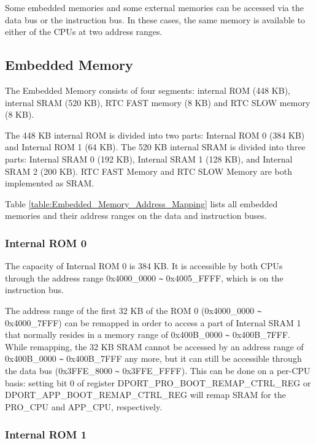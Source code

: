 \documentclass[main\_\_EN.tex]{subfiles}
\begin{document}
Some embedded memories and some external memories can be accessed via the data bus or the instruction bus. In these cases, the same memory is available to either of the CPUs at two address ranges.




\subsection{Embedded Memory}\label{para:embedded memory}

The Embedded Memory consists of four segments: internal ROM (448 KB), internal SRAM (520 KB), RTC FAST memory (8 KB) and RTC SLOW memory (8 KB).

The 448 KB internal ROM is divided into two parts: Internal ROM 0 (384 KB) and Internal ROM 1 (64 KB).
The 520 KB internal SRAM is divided into three parts: Internal SRAM 0 (192 KB), Internal SRAM 1 (128 KB), and Internal SRAM 2 (200 KB).
RTC FAST Memory and RTC SLOW Memory are both implemented as SRAM.

Table \ref{table:Embedded_Memory_Address_Mapping} lists all embedded memories and their address ranges on the data and instruction buses.
\newpage



\subsubsection{Internal ROM 0}

The capacity of Internal ROM 0 is 384 KB. It is accessible by both CPUs through the address range 0x4000\_0000 \verb+~+ 0x4005\_FFFF, which is on the instruction bus.

\label{para:RemapInternalROM0}
\hypertarget{Remap}{}
The address range of the first 32 KB of the ROM 0 (0x4000\_0000 \verb+~+ 0x4000\_7FFF)
can be remapped in order to access a part of Internal SRAM 1 that normally resides in a memory range of 0x400B\_0000 \verb+~+ 0x400B\_7FFF. While remapping, the 32 KB SRAM cannot be accessed by an address range of 0x400B\_0000 \verb+~+ 0x400B\_7FFF any more,
but it can still be accessible through the data bus (0x3FFE\_8000 \verb+~+ 0x3FFE\_FFFF).
This can be done on a per-CPU basis: setting bit 0 of register DPORT\_PRO\_BOOT\_REMAP\_CTRL\_REG or DPORT\_APP\_BOOT\_REMAP\_CTRL\_REG will remap SRAM for the PRO\_CPU and APP\_CPU, respectively. 

\subsubsection{Internal ROM 1}
\end{document}
